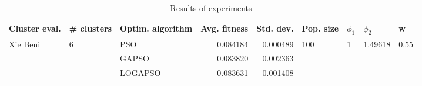 \begin{table}
\centering
\caption{Results of experiments}
\begin{tabular}{lllrrllll}
\toprule
            Cluster eval. &        \# clusters & Optim. algorithm &  Avg. fitness &  Std. dev. &            Pop. size &         $\phi_{1}$ &               $\phi_{2}$ &                     w \\
\midrule
\multirow{3}{*}{Xie Beni} & \multirow{3}{*}{6} &              PSO &      0.084184 &   0.000489 & \multirow{3}{*}{100} & \multirow{3}{*}{1} & \multirow{3}{*}{1.49618} & \multirow{3}{*}{0.55} \\
                          &                    &            GAPSO &      0.083820 &   0.002363 &                      &                    &                          &                       \\
                          &                    &          LOGAPSO &      0.083631 &   0.001408 &                      &                    &                          &                       \\
\bottomrule
\end{tabular}
\end{table}
